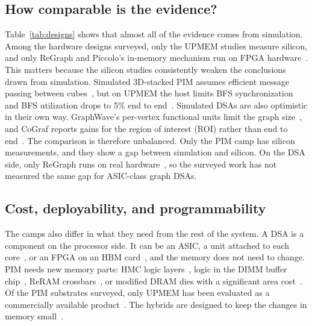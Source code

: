 \documentclass[journal,onecolumn]{IEEEtran}
\begin{document}
\subsection{How comparable is the evidence?}
Table~\ref{tab:designs} shows that almost all of the evidence comes from simulation. Among the hardware designs surveyed, only the UPMEM studies measure silicon, and only ReGraph and Piccolo's in-memory mechanism run on FPGA hardware~\cite{gomezluna2022prim,cai2024pimpam,barkhordar2025alphapim,asquini2025tc,chen2022regraph,shin2025piccolo}. This matters because the silicon studies consistently weaken the conclusions drawn from simulation. Simulated 3D-stacked PIM assumes efficient message passing between cubes~\cite{ahn2015tesseract,zhuo2019graphq}, but on UPMEM the host limits BFS synchronization~\cite{gomezluna2022prim} and BFS utilization drops to 5\% end to end~\cite{barkhordar2025alphapim}. Simulated DSAs are also optimistic in their own way. GraphWave's per-vertex functional units limit the graph size~\cite{lee2022graphwave}, and CoGraf reports gains for the region of interest (ROI) rather than end to end~\cite{yenimol2026cograf}. The comparison is therefore unbalanced. Only the PIM camp has silicon measurements, and they show a gap between simulation and silicon. On the DSA side, only ReGraph runs on real hardware~\cite{chen2022regraph}, so the surveyed work has not measured the same gap for ASIC-class graph DSAs.

\subsection{Cost, deployability, and programmability}
The camps also differ in what they need from the rest of the system. A DSA is a component on the processor side. It can be an ASIC, a unit attached to each core~\cite{mukkara2018hats,zhao2022tdgraph}, or an FPGA on an HBM card~\cite{chen2022regraph}, and the memory does not need to change. PIM needs new memory parts: HMC logic layers~\cite{ahn2015tesseract}, logic in the DIMM buffer chip~\cite{talati2022ndminer}, ReRAM crossbars~\cite{song2018graphr}, or modified DRAM dies with a significant area cost~\cite{shin2025fala}. Of the PIM substrates surveyed, only UPMEM has been evaluated as a commercially available product~\cite{gomezluna2022prim}. The hybrids are designed to keep the changes in memory small~\cite{shin2025piccolo,shin2025fala}.
\end{document}
